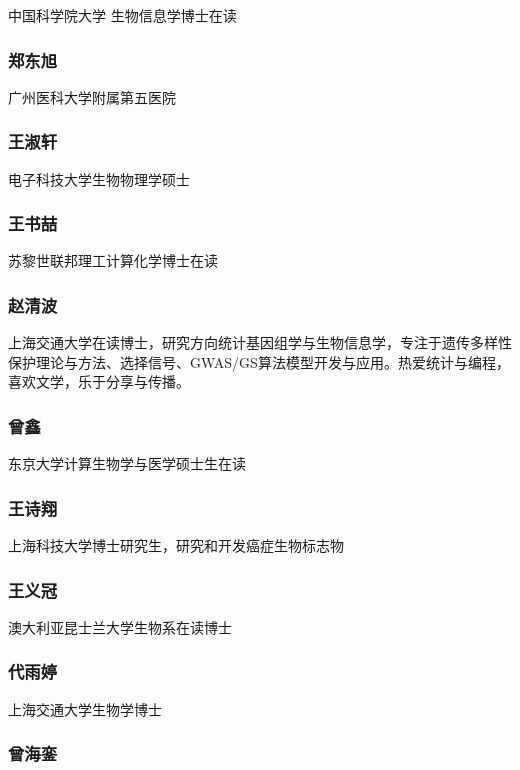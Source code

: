 \documentclass[]{article}
\begin{document}
中国科学院大学 生物信息学博士在读

\subsubsection{郑东旭}

广州医科大学附属第五医院

\subsubsection{王淑轩}

电子科技大学生物物理学硕士

\subsubsection{王书喆}

苏黎世联邦理工计算化学博士在读

\subsubsection{赵清波}

上海交通大学在读博士，研究方向统计基因组学与生物信息学，专注于遗传多样性保护理论与方法、选择信号、GWAS/GS算法模型开发与应用。热爱统计与编程，喜欢文学，乐于分享与传播。

\subsubsection{曾鑫}

东京大学计算生物学与医学硕士生在读

\subsubsection{王诗翔}

上海科技大学博士研究生，研究和开发癌症生物标志物

\subsubsection{王义冠}

澳大利亚昆士兰大学生物系在读博士

\subsubsection{代雨婷}

上海交通大学生物学博士

\subsubsection{曾海銮}
\end{document}
